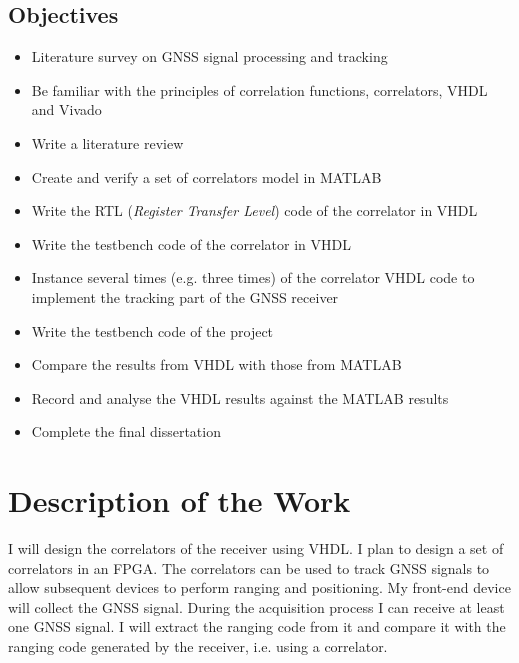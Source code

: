 \subsection{Objectives}
\begin{itemize}
    \item Literature survey on GNSS signal processing and tracking
    \item Be familiar with the principles of correlation functions, correlators, VHDL and Vivado
    \item Write a literature review
    \item Create and verify a set of correlators model in MATLAB
    \item Write the RTL (\textit{Register Transfer Level}) code of the correlator in VHDL
    \item Write the testbench code of the correlator in VHDL
    \item Instance several times (e.g. three times) of the correlator VHDL code to implement the tracking part of the GNSS receiver
    \item Write the testbench code of the project
    \item Compare the results from VHDL with those from MATLAB
    \item Record and analyse the VHDL results against the MATLAB results
    \item Complete the final dissertation
\end{itemize}

\section{Description of the Work}
I will design the correlators of the receiver using VHDL. I plan to design a set of correlators in an FPGA. The correlators can be used to track GNSS signals to allow subsequent devices to perform ranging and positioning. My front-end device will collect the GNSS signal. During the acquisition process I can receive at least one GNSS signal. I will extract the ranging code from it and compare it with the ranging code generated by the receiver, i.e. using a correlator.
